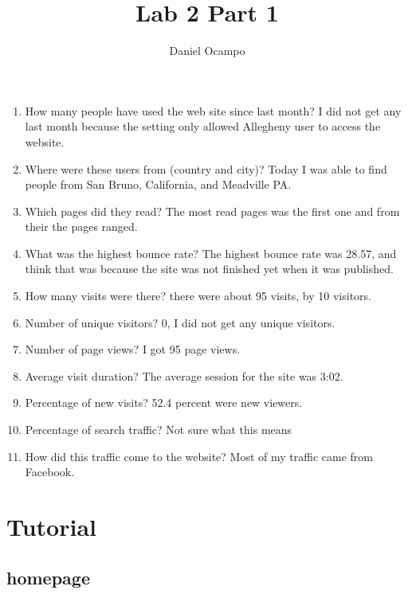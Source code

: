 \documentclass{article}
\begin{document}
\title{Lab 2 Part 1 }
\author{Daniel Ocampo}

\maketitle
\begin{enumerate}
    
\section{Questions in Red}    

\item How many people have used the web site since last month?
I did not get any last month because the setting only allowed Allegheny user to access the website.
\item  Where were these users from (country and city)?
Today I was able to find people from San Bruno, California, and Meadville PA.  
\item  Which pages did they read?
The most read pages was the first one and from their the pages ranged. 
\item  What was the highest bounce rate?
The highest bounce rate was 28.57, and think that was because the site was not finished yet when it was published. 
\item  How many visits were there?
there were about 95 visits, by 10 visitors.  
\item  Number of unique visitors?
0, I did not get any unique visitors.  
\item  Number of page views?
I got 95 page views. 

\item  Average visit duration?
The average session for the site was 3:02.  

\item  Percentage of new visits?
52.4 percent were new viewers. 
\item  Percentage of search traffic?
Not sure what this means 
\item  How did this traffic come to the website?
Most of my traffic came from Facebook. 

\end{enumerate}


\newpage
\section{Tutorial}
\subsection{homepage} 
\end{document}
